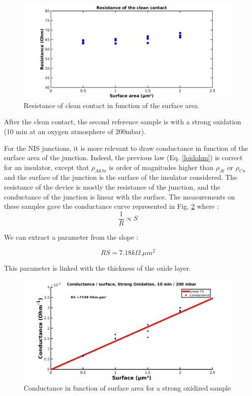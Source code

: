                 
                \begin{figure}
                    \centering
                    \includegraphics[width=15cm]{Rclean.png}
                    \caption{Resistance of clean contact in function of the surface area}
                    \label{cleancontact}
                \end{figure}
                
           
                After the clean contact, the second reference sample is with a strong oxidation (10 min at an oxygen atmosphere of 200mbar).

                For the NIS junctions, it is more relevant to draw conductance in function of the surface area of the junction. Indeed, the previous law (Eq. \ref{loidohm}) is correct for an insulator, except that $\rho_{AlOx}$ is order of magnitudes higher than $\rho_{Al}$ or $\rho_{Cu}$ and the surface of the junction is the surface of the insulator considered. The resistance of the device is mostly the resistance of the junction, and the conductance of the junction is linear with the surface. The measurements on these samples gave the conductance curve represented in Fig. \ref{Strongox} where :
                \[\dfrac{1}{R}\propto S\]
                
                We can extract a parameter from the slope :
                
                \[RS=7.18k\Omega.\mu m^2\]
                
                This parameter is linked with the thickness of the oxide layer.
                                
                \begin{figure}
                    \centering
                    \includegraphics[width=15cm]{ConductanceFitStrongOx.png}
                    \caption{Conductance in function of surface area for a strong oxidized sample}
                    \label{Strongox}
                \end{figure}
                
